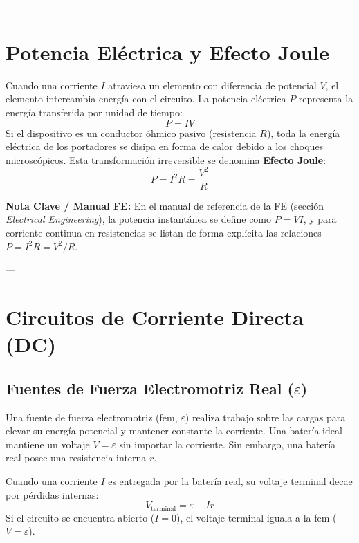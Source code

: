 \documentclass[12pt, a4paper]{article}
\newcommand{\nota}[1]{\begin{notabox}\textbf{Nota Clave / Manual FE:} #1\end{notabox}}
\begin{document}
---

\section{Potencia Eléctrica y Efecto Joule}

Cuando una corriente $I$ atraviesa un elemento con diferencia de potencial $V$, el elemento intercambia energía con el circuito. La potencia eléctrica $P$ representa la energía transferida por unidad de tiempo:
\begin{equation}
    P = I V
\end{equation}
Si el dispositivo es un conductor óhmico pasivo (resistencia $R$), toda la energía eléctrica de los portadores se disipa en forma de calor debido a los choques microscópicos. Esta transformación irreversible se denomina \textbf{Efecto Joule}:
\begin{equation}
    P = I^2 R = \frac{V^2}{R}
\end{equation}

\nota{
En el manual de referencia de la FE (sección \textit{Electrical Engineering}), la potencia instantánea se define como $P = VI$, y para corriente continua en resistencias se listan de forma explícita las relaciones $P = I^2 R = V^2 / R$.
}

---

\section{Circuitos de Corriente Directa (DC)}

\subsection{Fuentes de Fuerza Electromotriz Real ($\varepsilon$)}
Una fuente de fuerza electromotriz (fem, $\varepsilon$) realiza trabajo sobre las cargas para elevar su energía potencial y mantener constante la corriente. Una batería ideal mantiene un voltaje $V = \varepsilon$ sin importar la corriente. Sin embargo, una batería real posee una resistencia interna $r$.
\begin{definicion}
Cuando una corriente $I$ es entregada por la batería real, su voltaje terminal decae por pérdidas internas:
\begin{equation}
    V_{\text{terminal}} = \varepsilon - I r
\end{equation}
Si el circuito se encuentra abierto ($I = 0$), el voltaje terminal iguala a la fem ($V = \varepsilon$).
\end{definicion}
\end{document}
